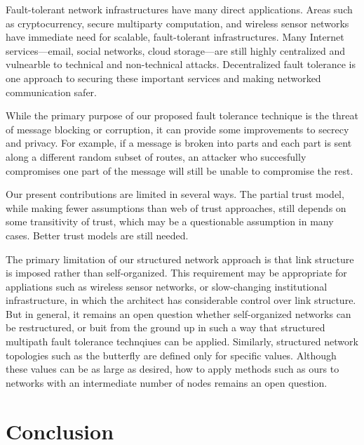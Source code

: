 \documentclass[prodmode,permissions]{acmsmall-ec16}
\begin{document}
Fault-tolerant network infrastructures have many direct applications.
Areas such as cryptocurrency, secure multiparty computation, and wireless
sensor networks have immediate need for scalable, fault-tolerant
infrastructures.
Many Internet services---email, social networks, cloud storage---are still
highly centralized and vulnearble to technical and non-technical attacks.
Decentralized fault tolerance is one approach to securing these important
services and making networked communication safer.

While the primary purpose of our proposed fault tolerance technique is the
threat of message blocking or corruption, it can provide some improvements
to secrecy and privacy.
For example, if a message is broken into parts and each part is sent along
a different random subset of routes, an attacker who succesfully compromises
one part of the message will still be unable to compromise the rest.

Our present contributions are limited in several ways.
The partial trust model, while making fewer assumptions than web of trust
approaches, still depends on some transitivity of trust,
which may be a questionable assumption in many cases.
Better trust models are still needed.

The primary limitation of our structured network approach is that
link structure is imposed rather than self-organized.
This requirement may be appropriate for appliations such as
wireless sensor networks,
or slow-changing institutional infrastructure,
in which the architect has considerable control over link structure.
But in general, it remains an open question whether self-organized networks
can be restructured, or buit from the ground up in such a way that
structured multipath fault tolerance technqiues can be applied.
Similarly, structured network topologies such as the butterfly are defined
only for specific values.
Although these values can be as large as desired,
how to apply methods such as ours to networks with an intermediate number
of nodes remains an open question.

\section{Conclusion}
\end{document}
